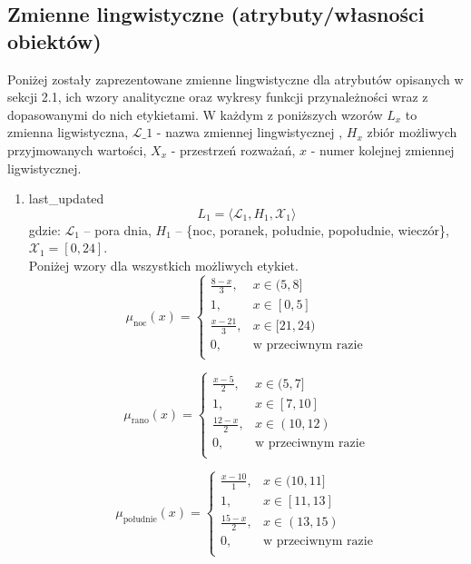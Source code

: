 \documentclass{article}
\begin{document}
\subsection{Zmienne lingwistyczne (atrybuty/własności obiektów)}
Poniżej zostały zaprezentowane zmienne lingwistyczne dla atrybutów opisanych w sekcji 2.1, ich wzory analityczne oraz wykresy funkcji przynależności wraz z dopasowanymi do nich etykietami. W każdym z poniższych wzorów \(L_x\) to zmienna ligwistyczna, \(\mathcal{L}\_1\) - nazwa zmiennej lingwistycznej , \(H_x\) zbiór możliwych przyjmowanych wartości, \(X_x\) - przestrzeń rozważań, \(x\) - numer kolejnej zmiennej ligwistycznej. 
\begin{enumerate}
    \item last\_updated
        \begin{equation}
            L_1 = \langle \mathcal{L}_1, H_1, \mathcal{X}_1 \rangle
        \end{equation}
        gdzie: $\mathcal{L}_1$ – pora dnia, $H_1$ – \{noc, poranek, południe, popołudnie, wieczór\}, $\mathcal{X}_1 = [0, 24]$. \\
        Poniżej wzory dla wszystkich możliwych etykiet.
        \begin{equation}
            \mu_{\text{noc}}(x) =
            \begin{cases}
            \frac{8 - x}{3}, & x \in (5, 8] \\
            1, & x \in [0, 5] \\
            \frac{x - 21}{3}, & x \in [21, 24) \\
            0, & \text{w przeciwnym razie} \\
            \end{cases}
        \end{equation}

        \begin{equation}
            \mu_{\text{rano}}(x) =
            \begin{cases}
            \frac{x - 5}{2}, & x \in (5, 7] \\
            1, & x \in [7, 10] \\
            \frac{12 - x}{2}, & x \in (10, 12) \\
            0, & \text{w przeciwnym razie} \\
            \end{cases}
        \end{equation}

        \begin{equation}
            \mu_{\text{południe}}(x) =
            \begin{cases}
            \frac{x - 10}{1}, & x \in (10, 11] \\
            1, & x \in [11, 13] \\
            \frac{15 - x}{2}, & x \in (13, 15) \\
            0, & \text{w przeciwnym razie} \\
            \end{cases}
        \end{equation}


\end{enumerate}
\end{document}
